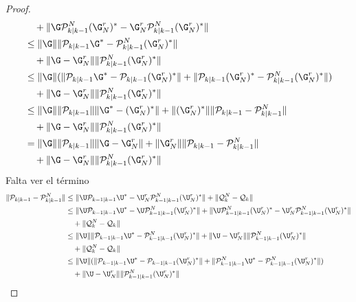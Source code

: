 \begin{proof}
\begin{equation*}
\begin{aligned}
			 & \quad +  \|  \G  \mathcal{P}^N_{k|k-1} (\G^r_N)^* - \G_N^r \mathcal{P}^N_{k|k-1} (\G^r_N)^* \| \\
			 & \leq \|  \G \| \| \mathcal{P}_{k|k-1} \G^* - \mathcal{P}^N_{k|k-1} (\G^r_N)^* \| \\
			 & \quad +  \|  \G  - \G_N^r  \| \| \mathcal{P}^N_{k|k-1} (\G^r_N)^* \| \\
			 & \leq \|  \G \| ( \| \mathcal{P}_{k|k-1} \G^* - \mathcal{P}_{k|k-1} (\G^r_N)^* \| + \| \mathcal{P}_{k|k-1} (\G_N^r)^* - \mathcal{P}^N_{k|k-1} (\G^r_N)^* \| ) \\
			 & \quad +  \|  \G  - \G_N^r  \| \| \mathcal{P}^N_{k|k-1} (\G^r_N)^* \| \\
			 & \leq \|  \G \|  \| \mathcal{P}_{k|k-1} \| \| \G^* - (\G^r_N)^* \|   + \| (\G_N^r)^* \| \| \mathcal{P}_{k|k-1}  - \mathcal{P}^N_{k|k-1}  \|  \\
			 & \quad + \|  \G  - \G_N^r  \| \| \mathcal{P}^N_{k|k-1} (\G^r_N)^* \| \\
			 & = \|  \G \|  \| \mathcal{P}_{k|k-1} \| \| \G - \G^r_N \|   + \| \G_N^r \| \| \mathcal{P}_{k|k-1}  - \mathcal{P}^N_{k|k-1}  \|  \\
			 & \quad + \|  \G  - \G_N^r  \| \| \mathcal{P}^N_{k|k-1} (\G^r_N)^* \| 
		\end{aligned}
	\end{equation*}
	Falta ver el término
	\begin{equation*}
		\begin{aligned}
			 \| \mathcal{P}_{k|k-1}  - \mathcal{P}^N_{k|k-1} \|  &  \leq \| \U \mathcal{P}_{k-1|k-1} \U^* - \U_N^r \mathcal{P}_{k-1|k-1}^N (\U_N^r)^* \| + \|  \mathcal{Q}_k^N -  \mathcal{Q}_k \| \\
			 & \leq \| \U \mathcal{P}_{k-1|k-1} \U^* - \U \mathcal{P}_{k-1|k-1}^N (\U_N^r)^*  \| + \| \U \mathcal{P}_{k-1|k-1}^N (\U_N^r)^*  - \U_N^r \mathcal{P}_{k-1|k-1}^N (\U_N^r)^*  \| \\
			 & \quad + \|  \mathcal{Q}_k^N -  \mathcal{Q}_k \| \\
			 & \leq \| \U \| \| \mathcal{P}_{k-1|k-1} \U^* -  \mathcal{P}_{k-1|k-1}^N (\U_N^r)^*  \| + \|  \U  - \U_N^r \|  \|  \mathcal{P}_{k-1|k-1}^N (\U_N^r)^* \| \\
			 & \quad + \|  \mathcal{Q}_k^N -  \mathcal{Q}_k \| \\
			 & \leq \| \U \| ( \| \mathcal{P}_{k-1|k-1} \U^* -  \mathcal{P}_{k-1|k-1} (\U_N^r)^*  \| +  \| \mathcal{P}_{k-1|k-1} ^N\U^* -  \mathcal{P}_{k-1|k-1}^N (\U_N^r)^*  \| ) \\
			 & \quad + \|  \U  - \U_N^r \|  \|  \mathcal{P}_{k-1|k-1}^N (\U_N^r)^* \| \\

\end{aligned}
\end{equation*}
\end{proof}

